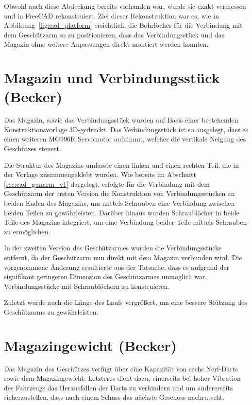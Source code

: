 Obwohl auch diese Abdeckung bereits vorhanden war, wurde sie
exakt vermessen und in FreeCAD rekonstruiert. Ziel dieser
Rekonstruktion war es, wie in Abbildung~\ref{fig:cad_platform} ersichtlich, die Bohrlöcher für die Verbindung mit dem
Geschützarm so zu positionieren, dass das Verbindungsstück und das
Magazin ohne weitere Anpassungen direkt montiert werden konnten.

\section{Magazin und Verbindungsstück (Becker)}

Das Magazin, sowie das Verbindungsstück wurden auf Basis einer bestehenden Konstruktionsvorlage \cite{cad_turret_blueprint} 3D-gedruckt. 
Das Verbindungsstück ist so ausgelegt, dass es einen weiteren MG996R Servomotor aufnimmt, welcher die vertikale Neigung des Geschützes
steuert.

Die Struktur des Magazins umfasste einen linken und einen rechten Teil, die in der Vorlage zusammengeklebt wurden.
Wie bereits im Abschnitt \ref{sec:cad_gunarm_v1} dargelegt, erfolgte für die Verbindung mit dem Geschützarm der ersten Version die Konstruktion von Verbindungsstücken an beiden Enden des Magazins, 
um mittels Schrauben eine Verbindung zwischen beiden Teilen zu gewährleisten.  Darüber hinaus wurden Schraublöcher in beide Teile des Magazins integriert, 
um eine Verbindung beider Teile mittels Schrauben zu ermöglichen.

In der zweiten Version des Geschützarmes wurden die Verbindungsstücke entfernt, da der Geschützarm nun direkt mit dem Magazin verbunden wird.
Die vorgenommene Änderung resultierte aus der Tatsache, dass es aufgrund der signifikant geringeren Dimension des Geschützarmes unmöglich war, Verbindungsstücke mit Schraublöchern zu konstruieren.

Zuletzt wurde auch die Länge des Laufs vergrößert, um eine bessere Stützung des Geschützarms zu gewährleisten.

\section{Magazingewicht (Becker)}

Das Magazin des Geschützes verfügt über eine Kapazität von sechs Nerf-Darts sowie dem Magazingewicht. 
Letzteres dient dazu, einerseits bei hoher Vibration des Fahrzeugs das Herausfallen der Darts zu verhindern und um andererseits sicherzustellen, dass nach einem Schuss das nächste Geschoss nachrutscht.

